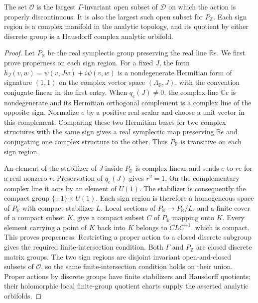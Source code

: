 \begin{theorem}[F.2.2; Proved]\label{st:F.2.2}
The set $\mathcal O$ is the largest $\Gamma$-invariant open subset of
$\mathcal D$ on which the action is properly discontinuous.  It is also
the largest such open subset for $P_{\mathbb Z}$.  Each sign region is
a complex manifold in the analytic topology, and its quotient by either
discrete group is a Hausdorff complex analytic orbifold.
\end{theorem}

\begin{proof}
Let $P_{\mathbb R}$ be the real symplectic group preserving the real line
$\mathbb Re$.  We first prove properness on each sign region.  For a fixed
$J$, the form
$h_J(v,w)=\psi(v,Jw)+i\psi(v,w)$ is a nondegenerate Hermitian form of
signature $(1,1)$ on the complex vector space $(\Lambda_{\mathbb R},J)$,
with the convention conjugate linear in the first entry.  When
$q_e(J)\ne0$, the complex line $\mathbb Ce$ is nondegenerate and its
Hermitian orthogonal complement is a complex line of the opposite sign.
Normalize $e$ by a positive real scalar and choose a unit vector in this
complement.  Comparing these two Hermitian bases for two complex
structures with the same sign gives a real symplectic map preserving
$\mathbb Re$ and conjugating one complex structure to the other.  Thus
$P_{\mathbb R}$ is transitive on each sign region.

An element of the stabilizer of $J$ inside $P_{\mathbb R}$ is complex
linear and sends $e$ to $r e$ for a real nonzero $r$.  Preservation of
$q_e(J)$ gives $r^2=1$.  On the complementary complex line it acts by an
element of $U(1)$.  The stabilizer is consequently the compact group
$\{\pm1\}\times U(1)$.  Each sign region is therefore a homogeneous
space of $P_{\mathbb R}$ with compact stabilizer $L$.  Local sections of
$P_{\mathbb R}\to P_{\mathbb R}/L$, and a finite cover of a compact
subset $K$, give a compact subset $C$ of $P_{\mathbb R}$ mapping onto
$K$.  Every element carrying a point of $K$ back into $K$ belongs to
$CLC^{-1}$, which is compact.  This proves properness.  Restricting a
proper action to a closed discrete subgroup gives
the required finite-intersection condition.  Both $\Gamma$ and
$P_{\mathbb Z}$ are closed discrete matrix groups.  The two sign regions
are disjoint invariant open-and-closed subsets of $\mathcal O$, so the
same finite-intersection condition holds on their union.  Proper actions
by discrete groups have finite stabilizers and Hausdorff quotients; their
holomorphic local finite-group quotient charts supply the asserted
analytic orbifolds.


\end{proof}
